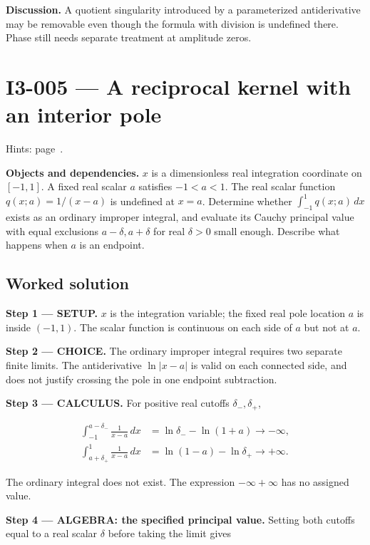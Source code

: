 \documentclass[11pt,oneside,openany]{book}
\begin{document}
\textbf{Discussion.} A quotient singularity introduced by a parameterized antiderivative may be removable even though the formula with division is undefined there. Phase still needs separate treatment at amplitude zeros.
\clearpage
\section{I3-005 --- A reciprocal kernel with an interior pole}
\label{problem:I3-005}
{\small Hints: page~\pageref{hints:I3-005}.}\par\medskip

\textbf{Objects and dependencies.} \(x\) is a dimensionless real integration coordinate on \([-1,1]\). A fixed real scalar \(a\) satisfies \(-1<a<1\). The real scalar function \(q(x;a)=1/(x-a)\) is undefined at \(x=a\). Determine whether \(\int_{-1}^1q(x;a)\,dx\) exists as an ordinary improper integral, and evaluate its Cauchy principal value with equal exclusions \(a-\delta,a+\delta\) for real \(\delta>0\) small enough. Describe what happens when \(a\) is an endpoint.
\subsection*{Worked solution}

\textbf{Step 1 --- SETUP.} \(x\) is the integration variable; the fixed real pole location \(a\) is inside \((-1,1)\). The scalar function is continuous on each side of \(a\) but not at \(a\).

\begin{ChoiceStep}
\textbf{Step 2 --- CHOICE.} The ordinary improper integral requires two separate finite limits. The antiderivative \(\ln|x-a|\) is valid on each connected side, and does not justify crossing the pole in one endpoint subtraction.

\end{ChoiceStep}
\textbf{Step 3 --- CALCULUS.} For positive real cutoffs \(\delta_-,\delta_+\),

\[
\begin{aligned}
\int_{-1}^{a-\delta_-}\frac{1}{x-a}\,dx&=\ln\delta_- -\ln(1+a)\longrightarrow-\infty,\\
\int_{a+\delta_+}^{1}\frac{1}{x-a}\,dx&=\ln(1-a)-\ln\delta_+\longrightarrow+\infty.
\end{aligned}
\]

The ordinary integral does not exist. The expression \(-\infty+\infty\) has no assigned value.

\begingroup\color{AlgebraBlue}
\textbf{Step 4 --- ALGEBRA: the specified principal value.} Setting both cutoffs equal to a real scalar \(\delta\) before taking the limit gives
\end{document}
